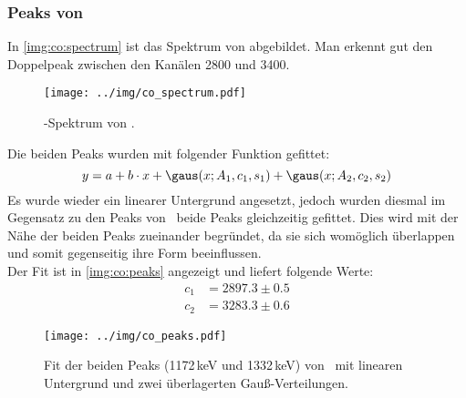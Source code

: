 \subsubsection{Peaks von \co}
\label{subsub:eval:co}
In \autoref{img:co:spectrum} ist das Spektrum von \co abgebildet. Man erkennt gut den Doppelpeak zwischen den Kanälen 2800 und 3400.
\begin{figure}[H]
\begin{center}
  \texttt{[image: ../img/co\_spectrum.pdf]}
  \caption{\textgamma-Spektrum von .}
  \label{img:co:spectrum}
\end{center}
\end{figure}
Die beiden Peaks wurden mit folgender Funktion gefittet:
\begin{equation}
  y = a + b\cdot x + \gaus(x; A_1, c_1, s_1) + \gaus(x; A_2, c_2, s_2)
\end{equation}
Es wurde wieder ein linearer Untergrund angesetzt, jedoch wurden diesmal im Gegensatz zu den Peaks von \na\, beide Peaks gleichzeitig gefittet. 
Dies wird mit der Nähe der beiden Peaks zueinander begründet, da sie sich womöglich überlappen und somit gegenseitig ihre Form beeinflussen.\\
Der Fit ist in \autoref{img:co:peaks} angezeigt und liefert folgende Werte:
\begin{equation}
\begin{split}
  \label{eq:co:channels}
  c_1 &= 2897.3 \pm 0.5 \\
  c_2 &= 3283.3 \pm 0.6
\end{split}
\end{equation}
\begin{figure}[H]
\begin{center}
  \texttt{[image: ../img/co\_peaks.pdf]}
  \caption{Fit der beiden Peaks (1172\,keV und 1332\,keV) von \co\,
  mit linearen Untergrund und zwei überlagerten Gauß-Verteilungen.}
  \label{img:co:peaks}
\end{center}
\end{figure}


